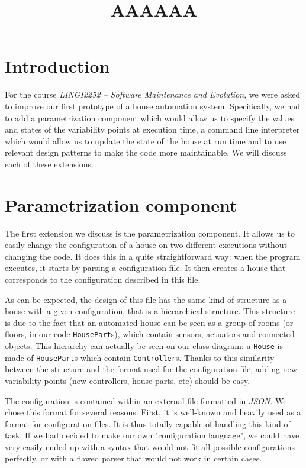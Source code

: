     \title{AAAAAA}
    \newpage

	\section{Introduction}
		For the course \textit{LINGI2252 -- Software Maintenance and Evolution}, we were asked to improve our first prototype of a house automation system. Specifically, we had to add a parametrization component which would allow us to specify the values and states of the variability points at execution time, a command line interpreter which would allow us to update the state of the house at run time and to use relevant design patterns to make the code more maintainable. We will discuss each of these extensions.

	\section{Parametrization component}
		The first extension we discuss is the parametrization component.
		It allows us to easily change the configuration of a house on two different executions without changing the code.
		It does this in a quite straightforward way: when the program executes, it starts by parsing a configuration file. It then creates a house that corresponds to the configuration described in this file.
		
		As can be expected, the design of this file has the same kind of structure as a house with a given configuration, that is a hierarchical structure. This structure is due to the fact that an automated house can be seen as a group of rooms (or floors, in our code \texttt{HousePart}s), which contain sensors, actuators and connected objects. This hierarchy can actually be seen on our class diagram: a \texttt{House} is made of \texttt{HousePart}s which contain \texttt{Controller}s. Thanks to this similarity between the structure and the format used for the configuration file, adding new variability points (new controllers, house parts, etc) should be easy.
		
		The configuration is contained within an external file formatted in \textit{JSON}. We chose this format for several reasons.
		First, it is well-known and heavily used as a format for configuration files. It is thus totally capable of handling this kind of task. If we had decided to make our own "configuration language", we could have very easily ended up with a syntax that would not fit all possible configurations perfectly, or with a flawed parser that would not work in certain cases.

